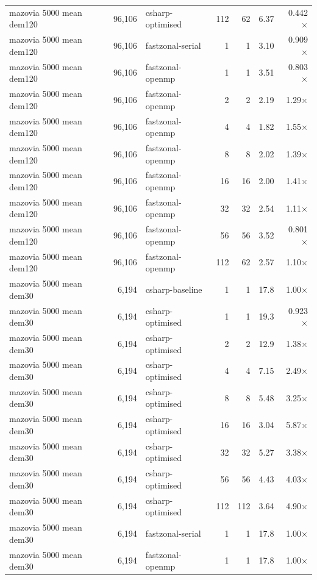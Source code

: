 \begin{tabular}{lrlrrrr}
mazovia 5000 mean dem120 & 96,106 & csharp-optimised & 112 & 62 & 6.37 & 0.442$\times$ \\
mazovia 5000 mean dem120 & 96,106 & fastzonal-serial & 1 & 1 & 3.10 & 0.909$\times$ \\
mazovia 5000 mean dem120 & 96,106 & fastzonal-openmp & 1 & 1 & 3.51 & 0.803$\times$ \\
mazovia 5000 mean dem120 & 96,106 & fastzonal-openmp & 2 & 2 & 2.19 & 1.29$\times$ \\
mazovia 5000 mean dem120 & 96,106 & fastzonal-openmp & 4 & 4 & 1.82 & 1.55$\times$ \\
mazovia 5000 mean dem120 & 96,106 & fastzonal-openmp & 8 & 8 & 2.02 & 1.39$\times$ \\
mazovia 5000 mean dem120 & 96,106 & fastzonal-openmp & 16 & 16 & 2.00 & 1.41$\times$ \\
mazovia 5000 mean dem120 & 96,106 & fastzonal-openmp & 32 & 32 & 2.54 & 1.11$\times$ \\
mazovia 5000 mean dem120 & 96,106 & fastzonal-openmp & 56 & 56 & 3.52 & 0.801$\times$ \\
mazovia 5000 mean dem120 & 96,106 & fastzonal-openmp & 112 & 62 & 2.57 & 1.10$\times$ \\
mazovia 5000 mean dem30 & 6,194 & csharp-baseline & 1 & 1 & 17.8 & 1.00$\times$ \\
mazovia 5000 mean dem30 & 6,194 & csharp-optimised & 1 & 1 & 19.3 & 0.923$\times$ \\
mazovia 5000 mean dem30 & 6,194 & csharp-optimised & 2 & 2 & 12.9 & 1.38$\times$ \\
mazovia 5000 mean dem30 & 6,194 & csharp-optimised & 4 & 4 & 7.15 & 2.49$\times$ \\
mazovia 5000 mean dem30 & 6,194 & csharp-optimised & 8 & 8 & 5.48 & 3.25$\times$ \\
mazovia 5000 mean dem30 & 6,194 & csharp-optimised & 16 & 16 & 3.04 & 5.87$\times$ \\
mazovia 5000 mean dem30 & 6,194 & csharp-optimised & 32 & 32 & 5.27 & 3.38$\times$ \\
mazovia 5000 mean dem30 & 6,194 & csharp-optimised & 56 & 56 & 4.43 & 4.03$\times$ \\
mazovia 5000 mean dem30 & 6,194 & csharp-optimised & 112 & 112 & 3.64 & 4.90$\times$ \\
mazovia 5000 mean dem30 & 6,194 & fastzonal-serial & 1 & 1 & 17.8 & 1.00$\times$ \\
mazovia 5000 mean dem30 & 6,194 & fastzonal-openmp & 1 & 1 & 17.8 & 1.00$\times$ \\

\end{tabular}
